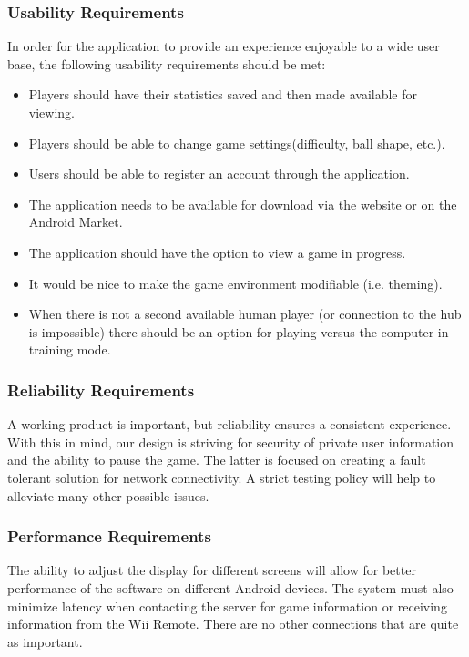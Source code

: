\documentclass[12pt]{article}
\begin{document}
\subsubsection{Usability Requirements}
In order for the application to provide an experience enjoyable to a wide 
user base, the following usability requirements should be met:
\begin{itemize}
\item Players should have their statistics saved and then made available 
for viewing.
\item Players should be able to change game settings(difficulty, ball shape, 
etc.).
\item Users should be able to register an account through the application.
\item The application needs to be available for download via the website 
or on the Android Market.
\item The application should have the option to view a game in progress.
\item It would be nice to make the game environment modifiable (i.e. theming).
\item When there is not a second available human player (or connection to 
the hub is impossible) there should be an option for playing versus the 
computer in training mode.
\end{itemize}

\subsubsection{Reliability Requirements}
A working product is important, but reliability ensures a consistent 
experience.  With this in mind, our design is striving for security of 
private user information and the ability to pause the game.  The latter is 
focused on creating a fault tolerant solution for network connectivity.  A 
strict testing policy will help to alleviate many other possible issues.

\subsubsection{Performance Requirements}
The ability to adjust the display for different screens will allow for 
better performance of the software on different Android devices.  The system 
must also minimize latency when contacting the server for game information 
or receiving information from the Wii Remote.  There are no other connections 
that are quite as important.
\end{document}
